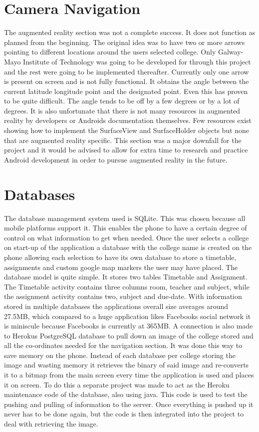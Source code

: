 \section{Camera Navigation}
The augmented reality section was not a complete success. It does not function as planned from the beginning. The original idea was to have two or more arrows pointing to different locations around the users selected college. Only Galway-Mayo Institute of Technology was going to be developed for through this project and the rest were going to be implemented thereafter. Currently only one arrow is present on screen and is not fully functional. It obtains the angle between the current latitude longitude point and the designated point. Even this has proven to be quite difficult. The angle tends to be off by a few degrees or by a lot of degrees. It is also unfortunate that there is not many resources in augmented reality by developers or Androids documentation themselves. Few resources exist showing how to implement the SurfaceView and SurfaceHolder objects but none that are augmented reality specific. This section was a major downfall for the project and it would be advised to allow for extra time to research and practice Android development in order to pursue augmented reality in the future.

\section{Databases}
The database management system used is SQLite. This was chosen because all mobile platforms support it. This enables the phone to have a certain degree of control on what information to get when needed. Once the user selects a college on start-up of the application a database with the college name is created on the phone allowing each selection to have its own database to store a timetable, assignments and custom google map markers the user may have placed. The database model is quite simple. It stores two tables Timetable and Assignment. The Timetable activity contains three columns room, teacher and subject, while the assignment activity contains two, subject and due-date. With information stored in multiple databases the applications overall size averages around 27.5MB, which compared to a huge application likes Facebooks social network it is miniscule because Facebooks is currently at 365MB. 
A connection is also made to Herokus PostgreSQL database to pull down an image of the college stored and all the co-ordinates needed for the navigation section. It was done this way to save memory on the phone. Instead of each database per college storing the image and wasting memory it retrieves the binary of said image and re-converts it to a bitmap from the main screen every time the application is used and places it on screen. To do this a separate project was made to act as the Heroku maintenance code of the database, also using java. This code is used to test the pushing and pulling of information to the server. Once everything is pushed up it never has to be done again, but the code is then integrated into the project to deal with retrieving the image.

